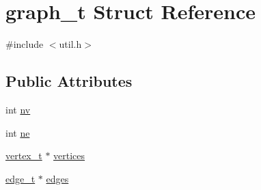 \hypertarget{structgraph__t}{
\section{graph\_\-t Struct Reference}
\label{structgraph__t}
}


{\ttfamily \#include $<$util.h$>$}

\subsection*{Public Attributes}
\begin{DoxyCompactItemize}
\item 
int \hyperlink{structgraph__t_a3142f6ebcc735e2b2ec64ff26e25c7ab}{nv}
\item 
int \hyperlink{structgraph__t_a4f79ef91eec39c1942041cc2f1d63eba}{ne}
\item 
\hyperlink{structvertex__t}{vertex\_\-t} $\ast$ \hyperlink{structgraph__t_a49c6f42fa769dc88d849d993cf7a1a86}{vertices}
\item 
\hyperlink{structedge__t}{edge\_\-t} $\ast$ \hyperlink{structgraph__t_affa31737d3a3289d654ff1a3967d2369}{edges}
\end{DoxyCompactItemize}


